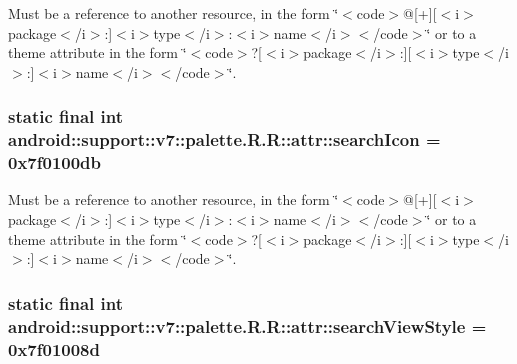 Must be a reference to another resource, in the form \char`\"{}$<$code$>$@\mbox{[}+\mbox{]}\mbox{[}$<$i$>$package$<$/i$>$:\mbox{]}$<$i$>$type$<$/i$>$:$<$i$>$name$<$/i$>$$<$/code$>$\char`\"{} or to a theme attribute in the form \char`\"{}$<$code$>$?\mbox{[}$<$i$>$package$<$/i$>$:\mbox{]}\mbox{[}$<$i$>$type$<$/i$>$:\mbox{]}$<$i$>$name$<$/i$>$$<$/code$>$\char`\"{}. \hypertarget{classandroid_1_1support_1_1v7_1_1palette_1_1_r_1_1attr_14bf5080819d4ef9138460911b2a6b76}{
\subsubsection[{searchIcon}]{\setlength{\rightskip}{0pt plus 5cm}static final int android::support::v7::palette.R.R::attr::searchIcon = 0x7f0100db}}
\label{classandroid_1_1support_1_1v7_1_1palette_1_1_r_1_1attr_14bf5080819d4ef9138460911b2a6b76}


Must be a reference to another resource, in the form \char`\"{}$<$code$>$@\mbox{[}+\mbox{]}\mbox{[}$<$i$>$package$<$/i$>$:\mbox{]}$<$i$>$type$<$/i$>$:$<$i$>$name$<$/i$>$$<$/code$>$\char`\"{} or to a theme attribute in the form \char`\"{}$<$code$>$?\mbox{[}$<$i$>$package$<$/i$>$:\mbox{]}\mbox{[}$<$i$>$type$<$/i$>$:\mbox{]}$<$i$>$name$<$/i$>$$<$/code$>$\char`\"{}. \hypertarget{classandroid_1_1support_1_1v7_1_1palette_1_1_r_1_1attr_bae6f725d94932015652b17ac9a50a74}{
\subsubsection[{searchViewStyle}]{\setlength{\rightskip}{0pt plus 5cm}static final int android::support::v7::palette.R.R::attr::searchViewStyle = 0x7f01008d}}
\label{classandroid_1_1support_1_1v7_1_1palette_1_1_r_1_1attr_bae6f725d94932015652b17ac9a50a74}


